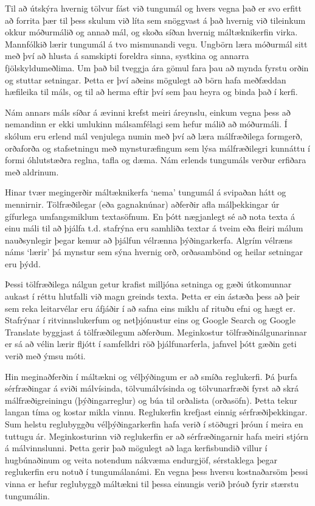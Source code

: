 \documentclass{../../metanetpaper}
\begin{document}
\begin{multicols}{2}
Til að útskýra hvernig tölvur fást við tungumál og hvers vegna það er svo erfitt að forrita þær til þess skulum við líta sem snöggvast á það hvernig við tileinkum okkur móðurmálið og annað mál, og skoða síðan hvernig máltæknikerfin virka.\clearpage {} Mannfólkið lærir tungumál á tvo mismunandi vegu. Ungbörn læra móðurmál sitt með því að hlusta á samskipti foreldra sinna, systkina og annarra fjölskyldumeðlima. Um það bil tveggja ára gömul fara þau að mynda fyrstu orðin og stuttar setningar. Þetta er því aðeins mögulegt að börn hafa meðfæddan hæfileika til máls, og til að herma eftir því sem þau heyra og binda það í kerfi.

Nám annars máls síðar á ævinni krefst meiri áreynslu, einkum vegna þess að nemandinn er ekki umlukinn málsamfélagi sem hefur málið að móðurmáli. Í skólum eru erlend mál venjulega numin með því að læra málfræðilega formgerð, orðaforða og stafsetningu með mynsturæfingum sem lýsa málfræðilegri kunnáttu í formi óhlutstæðra reglna, tafla og dæma. Nám erlends tungumáls verður erfiðara með aldrinum.

Hinar tvær megingerðir máltæknikerfa ‘nema’ tungumál á svipaðan hátt og mennirnir. Tölfræðilegar (eða gagnaknúnar) aðferðir afla málþekkingar úr gífurlega umfangsmiklum textasöfnum. En þótt nægjanlegt sé að nota texta á einu máli til að þjálfa t.d. stafrýna eru samhliða textar á tveim eða fleiri málum nauðsynlegir þegar kemur að þjálfun vélrænna þýðingarkerfa. Algrím vélræns náms ‘lærir’ þá mynstur sem sýna hvernig orð, orðasambönd og heilar setningar eru þýdd.

Þessi tölfræðilega nálgun getur krafist milljóna setninga og gæði útkomunnar aukast í réttu hlutfalli við magn greinds texta. Þetta er ein ástæða þess að þeir sem reka leitarvélar eru áfjáðir í að safna eins miklu af rituðu efni og hægt er. Stafrýnar í ritvinnslukerfum og netþjónustur eins og Google Search og Google Translate byggjast á tölfræðilegum aðferðum. Meginkostur tölfræðinálgunarinnar er sá að vélin lærir fljótt í samfelldri röð þjálfunarferla, jafnvel þótt gæðin geti verið með ýmsu móti.

Hin meginaðferðin í máltækni og vélþýðingum er að smíða reglukerfi. Þá þurfa sérfræðingar á sviði málvísinda, tölvumálvísinda og tölvunarfræði fyrst að skrá málfræðigreiningu (þýðingarreglur) og búa til orðalista (orðasöfn). Þetta tekur langan tíma og kostar mikla vinnu. Reglukerfin krefjast einnig sérfræðiþekkingar. Sum helstu reglubyggðu vélþýðingarkerfin hafa verið í stöðugri þróun í meira en tuttugu ár. Meginkosturinn við reglukerfin er að sérfræðingarnir hafa meiri stjórn á málvinnslunni. Þetta gerir það mögulegt að laga kerfisbundið villur í hugbúnaðinum og veita notendum nákvæma endurgjöf, sérstaklega þegar reglukerfin eru notuð í tungumálanámi. En vegna þess hversu kostnaðarsöm þessi vinna er hefur reglubyggð máltækni til þessa einungis verið þróuð fyrir stærstu tungumálin.


\end{multicols}
\end{document}
